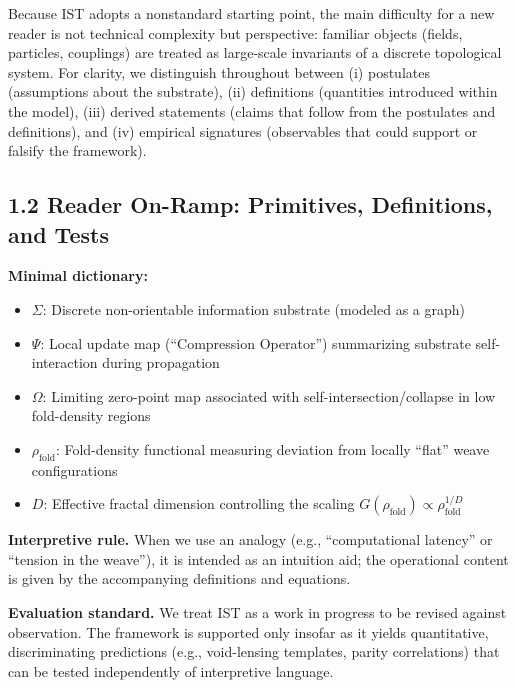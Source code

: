\documentclass[
  11pt,
]{article}
\providecommand{\tightlist}{%
  \setlength{\itemsep}{0pt}\setlength{\parskip}{0pt}}
\begin{document}
Because IST adopts a nonstandard starting point, the main difficulty for
a new reader is not technical complexity but perspective: familiar
objects (fields, particles, couplings) are treated as large-scale
invariants of a discrete topological system. For clarity, we distinguish
throughout between (i) postulates (assumptions about the substrate),
(ii) definitions (quantities introduced within the model), (iii) derived
statements (claims that follow from the postulates and definitions), and
(iv) empirical signatures (observables that could support or falsify the
framework).

\subsection{1.2 Reader On-Ramp: Primitives, Definitions, and
Tests}\label{reader-on-ramp-primitives-definitions-and-tests}

\textbf{Minimal dictionary:}

\begin{itemize}
\tightlist
\item
  \textbf{\(\Sigma\)}: Discrete non-orientable information substrate
  (modeled as a graph)
\item
  \textbf{\(\Psi\)}: Local update map (``Compression Operator'')
  summarizing substrate self-interaction during propagation
\item
  \textbf{\(\Omega\)}: Limiting zero-point map associated with
  self-intersection/collapse in low fold-density regions
\item
  \textbf{\(\rho_{\text{fold}}\)}: Fold-density functional measuring
  deviation from locally ``flat'' weave configurations
\item
  \textbf{\(D\)}: Effective fractal dimension controlling the scaling
  \(G(\rho_{\text{fold}}) \propto \rho_{\text{fold}}^{1/D}\)
\end{itemize}

\textbf{Interpretive rule.} When we use an analogy (e.g.,
``computational latency'' or ``tension in the weave''), it is intended
as an intuition aid; the operational content is given by the
accompanying definitions and equations.

\textbf{Evaluation standard.} We treat IST as a work in progress to be
revised against observation. The framework is supported only insofar as
it yields quantitative, discriminating predictions (e.g., void-lensing
templates, parity correlations) that can be tested independently of
interpretive language.
\end{document}
